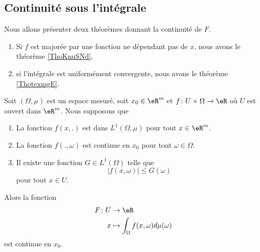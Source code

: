 \subsection{Continuité sous l'intégrale}

Nous allons présenter deux théorèmes donnant la continuité de \( F\).
\begin{enumerate}
    \item
        Si \( f\) est majorée par une fonction ne dépendant pas de \( x\), nous avons le théorème \ref{ThoKnuSNd},
    \item
        si l'intégrale est uniformément convergente, nous avons le théorème \ref{ThotexmgE}.
\end{enumerate}

\begin{theorem} \label{ThoKnuSNd}
    Soit \( (\Omega,\mu)\) est un espace mesuré, soit \( x_0\in \eR^m\) et \( f\colon U\times \Omega\to \eR\) où \( U\) est ouvert dans \( \eR^m\). Nous supposons que
    \begin{enumerate}
        \item
            La fonction \( f(x,.)\) est dans \( L^1(\Omega,\mu)\) pour tout \( x \in \eR^m\).
        \item
            La fonction \( f(.,\omega)\) est continue en \( x_0\) pour tout \( \omega\in\Omega\).
        \item       \label{ItemNAuYNG}
            Il existe une fonction \( G\in L^1(\Omega)\) telle que
            \begin{equation}
                | f(x,\omega) |\leq G(\omega)
            \end{equation}
            pour tout \( x\in U\).
    \end{enumerate}
    Alors la fonction 
    \begin{equation}
        \begin{aligned}
            F\colon U&\to \eR \\
            x&\mapsto \int_{\Omega}f(x,\omega)d\mu(\omega) 
        \end{aligned}
    \end{equation}
    est continue en \( x_0\).
\end{theorem}

